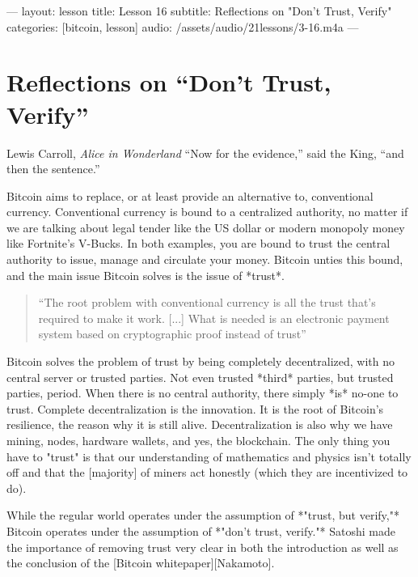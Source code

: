 ---
layout: lesson
title: Lesson 16
subtitle: Reflections on "Don't Trust, Verify"
categories: [bitcoin, lesson]
audio: /assets/audio/21lessons/3-16.m4a
---

\chapter{ Reflections on ``Don't Trust, Verify''}
\label{les:16}

\begin{chapquote}{Lewis Carroll, \textit{Alice in Wonderland}}
``Now for the evidence,'' said the King, ``and then the sentence.''
\end{chapquote}

Bitcoin aims to replace, or at least provide an alternative to,
conventional currency. Conventional currency is bound to a centralized
authority, no matter if we are talking about legal tender like the US
dollar or modern monopoly money like Fortnite's V-Bucks. In both
examples, you are bound to trust the central authority to issue, manage
and circulate your money. Bitcoin unties this bound, and the main issue
Bitcoin solves is the issue of *trust*.

\begin{quotation}
``The root problem with conventional currency is all the trust that's
required to make it work. [...] What is needed is an electronic
payment system based on cryptographic proof instead of trust''
\end{quotation}

Bitcoin solves the problem of trust by being completely decentralized,
with no central server or trusted parties. Not even trusted *third*
parties, but trusted parties, period. When there is no central
authority, there simply *is* no-one to trust. Complete decentralization
is the innovation. It is the root of Bitcoin's resilience, the reason
why it is still alive. Decentralization is also why we have mining,
nodes, hardware wallets, and yes, the blockchain. The only thing you
have to "trust" is that our understanding of mathematics and physics
isn't totally off and that the [majority] of miners act honestly (which
they are incentivized to do).

While the regular world operates under the assumption of *"trust, but
verify,"* Bitcoin operates under the assumption of *"don't trust,
verify."* Satoshi made the importance of removing trust very clear in
both the introduction as well as the conclusion of the [Bitcoin
whitepaper][Nakamoto].

